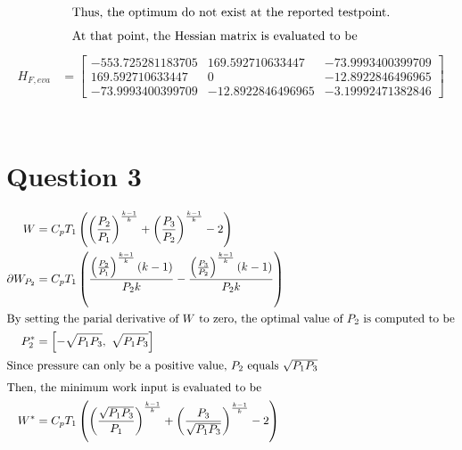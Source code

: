 \documentclass[a4paper,12pt]{article} %
\begin{document}
\begin{align*}
\intertext{Thus, the optimum do not exist at the reported testpoint.}
\intertext{At that point, the Hessian matrix is evaluated to be}
\end{align*}
\begin{align*}
H_{F,eva} &= \left[\begin{matrix}-553.725281183705 & 169.592710633447 & -73.9993400399709\\169.592710633447 & 0 & -12.8922846496965\\-73.9993400399709 & -12.8922846496965 & -3.19992471382846\end{matrix}\right]\\
\end{align*}
\\


\section{\textbf{Question 3}}
\begin{align*}
W &=C_{p} T_{1} \left(\left(\frac{P_{2}}{P_{1}}\right)^{\frac{k - 1}{k}} + \left(\frac{P_{3}}{P_{2}}\right)^{\frac{k - 1}{k}} - 2\right)\\
\partial W_{P_2} &= C_{p} T_{1} \left(\frac{\left(\frac{P_{2}}{P_{1}}\right)^{\frac{k - 1}{k}} \left(k - 1\right)}{P_{2} k} - \frac{\left(\frac{P_{3}}{P_{2}}\right)^{\frac{k - 1}{k}} \left(k - 1\right)}{P_{2} k}\right)\\
\intertext{By setting the parial derivative of $W$ to zero, the optimal value of $P_2$ is computed to be}
P_2^* &= \left[ - \sqrt{P_{1} P_{3}}, \  \sqrt{P_{1} P_{3}}\right]\\
\intertext{Since pressure can only be a positive value, $P_2$ equals $\sqrt{P_{1} P_{3}}$ }
\intertext{Then, the minimum work input is evaluated to be}
W^* &= C_{p} T_{1} \left(\left(\frac{\sqrt{P_{1} P_{3}}}{P_{1}}\right)^{\frac{k - 1}{k}} + \left(\frac{P_{3}}{\sqrt{P_{1} P_{3}}}\right)^{\frac{k - 1}{k}} - 2\right)
\end{align*}
\end{document}
